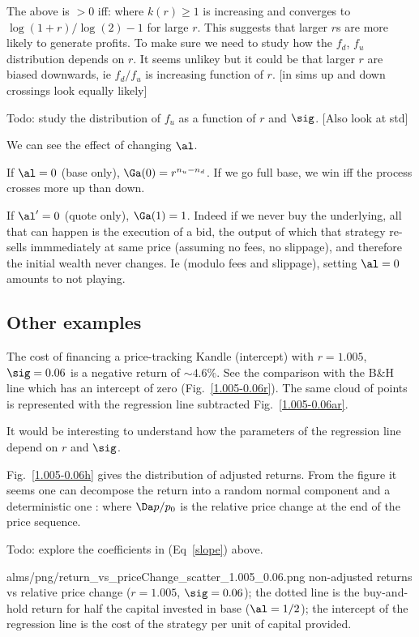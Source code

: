 \documentclass[oneside,10pt]{article}
\begin{document}
The above is $>0$ iff:
where $k(r)\geq 1$ is increasing and converges to $\log(1+r)/\log(2) -1$ for large $r$.
This suggests that  larger $r$s are more likely to generate profits. To make sure we need
to study how the $f_d$, $f_u$ distribution depends on $r$. It seems unlikey but it could be that larger $r$ are biased 
downwards, ie $f_d/f_u$ is increasing function of $r$. [in sims up and down crossings 
look equally likely]

Todo: study the distribution of $f_u$ as a function of $r$ and $\sig$. [Also look at std]

We can see the effect of changing $\al$.

If $\al=0$ (base only), $\Ga(0) = r^{n_u-n_d}$. If we go full base,
we win iff the process crosses more up than down.

If $\al'=0$ (quote only), $\Ga(1) = 1$. Indeed if we never buy the underlying,
all that can happen is the execution of a bid, 
the output of which that strategy re-sells immmediately at same price (assuming no fees, no slippage),
and therefore the initial wealth never changes. Ie (modulo fees and slippage), setting $\al=0$ amounts to not playing.


\subsection{Other examples}
The cost of financing a price-tracking Kandle (intercept) with $r=1.005$, $\sig=0.06$ is a negative return of 
$\sim 4.6\%$. See the comparison with the B\&H line which has an intercept of zero (Fig.~\ref{1.005-0.06r}).
The same cloud of points is represented with the regression line subtracted Fig.~\ref{1.005-0.06ar}.

It would be interesting to understand how the parameters of the regression line depend on $r$ and $\sig$.

Fig.~\ref{1.005-0.06h} gives the distribution of adjusted returns. 
From the figure it seems one can decompose the return into a random normal component
and a deterministic one      :
where $\Da p/p_0$ is the relative price change at the end of the price sequence.

Todo: explore the coefficients in (Eq~\ref{slope}) above.

\IG{420pt}
{alms/png/return_vs_priceChange_scatter_1.005_0.06.png}
{\label{1.005-0.06r} non-adjusted returns vs relative price change ($r=1.005$, $\sig=0.06$); the dotted line is the buy-and-hold
return for half the capital invested in base ($\al=1/2$); the intercept of the regression line 
is the cost of the strategy per unit of capital provided.}
\end{document}
